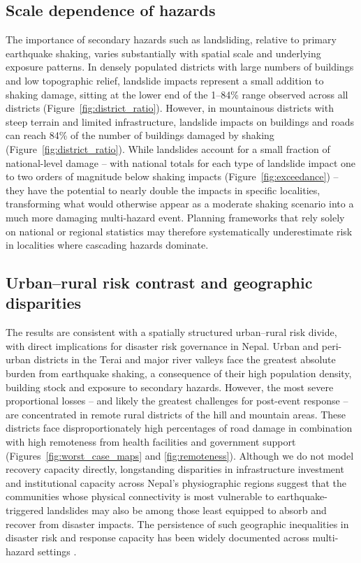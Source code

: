 \documentclass[preprint,12pt,authoryear]{elsarticle}
\begin{document}
\subsection{Scale dependence of hazards}

The importance of secondary hazards such as landsliding, relative to primary earthquake shaking, varies substantially with spatial scale and underlying exposure patterns. In densely populated districts with large numbers of buildings and low topographic relief, landslide impacts represent a small addition to shaking damage, sitting at the lower end of the 1--84\% range observed across all districts (Figure~\ref{fig:district_ratio}). However, in mountainous districts with steep terrain and limited infrastructure, landslide impacts on buildings and roads can reach 84\% of the number of buildings damaged by shaking (Figure~\ref{fig:district_ratio}). While landslides account for a small fraction of national-level damage -- with national totals for each type of landslide impact one to two orders of magnitude below shaking impacts (Figure~\ref{fig:exceedance}) -- they have the potential to nearly double the impacts in specific localities, transforming what would otherwise appear as a moderate shaking scenario into a much more damaging multi-hazard event. Planning frameworks that rely solely on national or regional statistics may therefore systematically underestimate risk in localities where cascading hazards dominate.

\subsection{Urban--rural risk contrast and geographic disparities}

The results are consistent with a spatially structured urban--rural risk divide, with direct implications for disaster risk governance in Nepal. Urban and peri-urban districts in the Terai and major river valleys face the greatest absolute burden from earthquake shaking, a consequence of their high population density, building stock and exposure to secondary hazards. However, the most severe proportional losses -- and likely the greatest challenges for post-event response -- are concentrated in remote rural districts of the hill and mountain areas. These districts face disproportionately high percentages of road damage in combination with high remoteness from health facilities and government support (Figures~\ref{fig:worst_case_maps} and \ref{fig:remoteness}). Although we do not model recovery capacity directly, longstanding disparities in infrastructure investment and institutional capacity across Nepal's physiographic regions \citep{NationalPlanningCommission2014} suggest that the communities whose physical connectivity is most vulnerable to earthquake-triggered landslides may also be among those least equipped to absorb and recover from disaster impacts. The persistence of such geographic inequalities in disaster risk and response capacity has been widely documented across multi-hazard settings \citep{Wisner2004}.
\end{document}
